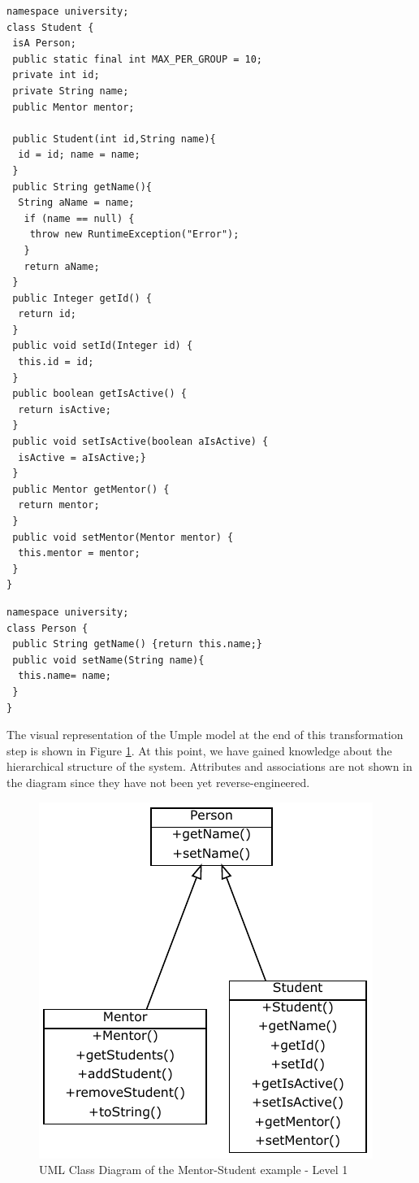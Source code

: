\begin{lstlisting}[style=UmpleIn,caption=Student.ump,label=lst:studentUmple0]
namespace university;
class Student {
 isA Person;
 public static final int MAX_PER_GROUP = 10; 
 private int id; 
 private String name;
 public Mentor mentor; 

 public Student(int id,String name){ 
  id = id; name = name; 
 } 
 public String getName(){
  String aName = name;
   if (name == null) { 
    throw new RuntimeException("Error");
   } 
   return aName; 
 }
 public Integer getId() {
  return id;
 }
 public void setId(Integer id) { 
  this.id = id; 
 } 
 public boolean getIsActive() { 
  return isActive;
 }
 public void setIsActive(boolean aIsActive) {
  isActive = aIsActive;} 
 }   
 public Mentor getMentor() { 
  return mentor; 
 }
 public void setMentor(Mentor mentor) { 
  this.mentor = mentor; 
 } 
}
\end{lstlisting}

\begin{lstlisting}[style=UmpleIn,caption=Person.ump,label=lst:personUmple0]
namespace university;
class Person { 
 public String getName() {return this.name;}
 public void setName(String name){
  this.name= name;
 }
}
\end{lstlisting}

The visual representation of the Umple model at the end of this transformation step is shown in Figure \ref{fig:Example1a1}. At this point, we have gained knowledge about the hierarchical structure of the system. Attributes and associations are not shown in the diagram since they have not been yet reverse-engineered.

\begin{figure}[h]
\centering
\includegraphics{Figures/Example1a1.pdf} 
\caption{UML Class Diagram of the Mentor-Student example - Level 1}
\label{fig:Example1a1}
\end{figure}

